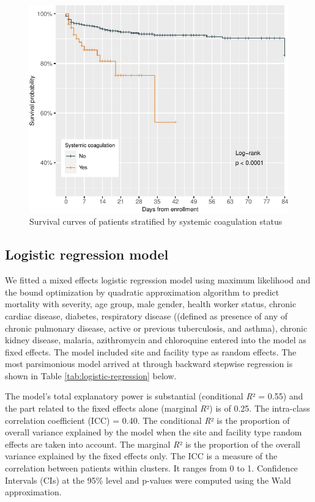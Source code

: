 \documentclass[
  10pt,
]{article}
\begin{document}
\newpage
\begin{figure}[h]

{\centering \includegraphics{results_files/figure-latex/coagulation-1} 

}

\caption{Survival curves of patients stratified by systemic coagulation status}\label{fig:coagulation}
\end{figure}

\newpage

\hypertarget{logistic-regression-model}{%
\subsection{Logistic regression model}\label{logistic-regression-model}}

We fitted a mixed effects logistic regression model using maximum
likelihood and the bound optimization by quadratic approximation
algorithm to predict mortality with severity, age group, male gender,
health worker status, chronic cardiac disease, diabetes, respiratory
disease ((defined as presence of any of chronic pulmonary disease,
active or previous tuberculosis, and asthma), chronic kidney disease,
malaria, azithromycin and chloroquine entered into the model as fixed
effects. The model included site and facility type as random effects.
The most parsimonious model arrived at through backward stepwise
regression is shown in Table \ref{tab:logistic-regression} below.

The model's total explanatory power is substantial (conditional
\emph{R}² = 0.55) and the part related to the fixed effects alone
(marginal \emph{R}²) is of 0.25. The intra-class correlation coefficient
(ICC) = 0.40. The conditional \emph{R}² is the proportion of overall
variance explained by the model when the site and facility type random
effects are taken into account. The marginal \emph{R}² is the proportion
of the overall variance explained by the fixed effects only. The ICC is
a measure of the correlation between patients within clusters. It ranges
from 0 to 1. Confidence Intervals (CIs) at the 95\% level and p-values
were computed using the Wald approximation.
\end{document}

